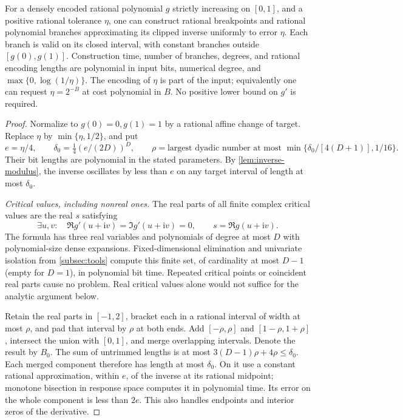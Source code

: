 \begin{theorem}\label{thm:inverse-approximation}
For a densely encoded rational polynomial $g$ strictly increasing on
$[0,1]$, and a positive rational tolerance $\eta$, one can construct
rational breakpoints and rational polynomial branches approximating its
clipped inverse uniformly to error $\eta$. Each branch is valid on its
closed interval, with constant branches outside $[g(0),g(1)]$.
Construction time, number of branches, degrees, and rational encoding
lengths are polynomial in input bits, numerical degree, and
$\max\{0,\log(1/\eta)\}$. The encoding of $\eta$ is part of the input;
equivalently one can request $\eta=2^{-B}$ at cost polynomial in $B$.
No positive lower bound on $g'$ is required.
\end{theorem}
\begin{proof}
Normalize to $g(0)=0,g(1)=1$ by a rational affine change of target.
Replace $\eta$ by $\min\{\eta,1/2\}$, and put
\begin{equation}\label{eq:inverse-bad-tolerance}
 e=\eta/4,\qquad \delta_0=\tfrac14(e/(2D))^D,\qquad
 \rho=\text{largest dyadic number at most }
          \min\{\delta_0/[4(D+1)],1/16\}.
\end{equation}
Their bit lengths are polynomial in the stated parameters. By
\cref{lem:inverse-modulus}, the inverse oscillates by less than $e$ on
any target interval of length at most $\delta_0$.

\emph{Critical values, including nonreal ones.}
The real parts of all finite complex critical values are the real $s$
satisfying
\begin{equation}\label{eq:critical-projection}
 \exists u,v:\quad
 \Re g'(u+\mathrm i v)=\Im g'(u+\mathrm i v)=0,\qquad
                         s=\Re g(u+\mathrm i v).
\end{equation}
The formula has three real variables and polynomials of degree at most
$D$ with polynomial-size dense expansions. Fixed-dimensional elimination
and univariate isolation from \cref{subsec:tools} compute this finite
set, of cardinality at most $D-1$ (empty for $D=1$), in polynomial bit
time. Repeated critical points or coincident real parts cause no problem.
Real critical values alone would not suffice for the analytic argument
below.

Retain the real parts in $[-1,2]$, bracket each in a rational interval
of width at most $\rho$, and pad that interval by $\rho$ at both ends.
Add $[-\rho,\rho]$ and $[1-\rho,1+\rho]$, intersect the union with
$[0,1]$, and merge overlapping intervals. Denote the result by $B_0$.
The sum of untrimmed lengths is at most
$3(D-1)\rho+4\rho\le\delta_0$. Each merged component therefore has
length at most $\delta_0$. On it use a constant rational approximation,
within $e$, of the inverse at its rational midpoint; monotone bisection
in response space computes it in polynomial time. Its error on the whole
component is less than $2e$. This also handles endpoints and interior
zeros of the derivative.


\end{proof}

